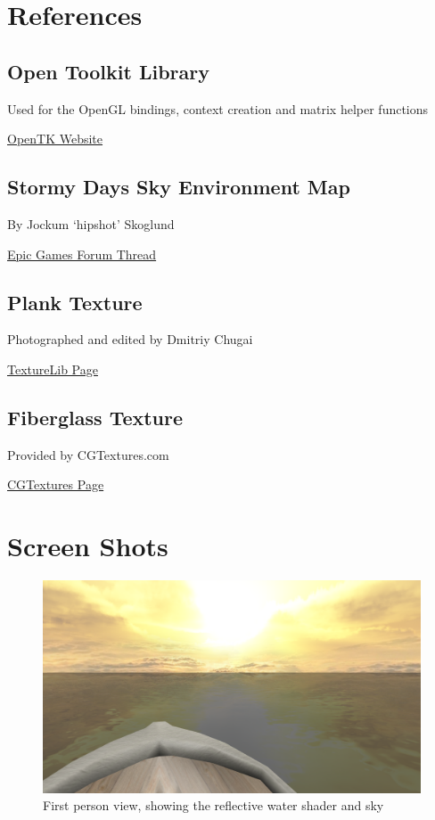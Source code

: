 \documentclass[a4paper,11pt]{article}
\begin{document}
\section{References}
\subsection{Open Toolkit Library}
Used for the OpenGL bindings, context creation and matrix helper functions

\href{http://www.opentk.com/}{OpenTK Website}

\subsection{Stormy Days Sky Environment Map}
By Jockum `hipshot' Skoglund

\href{http://forums.epicgames.com/threads/506748-My-skies-and-and-cliff-textures-(large-images}{Epic Games Forum Thread}

\subsection{Plank Texture}
Photographed and edited by Dmitriy Chugai

\href{http://texturelib.com/texture/?path=/Textures/wood/planks+new/wood_planks_new_0034}{TextureLib Page}

\subsection{Fiberglass Texture}
Provided by CGTextures.com

\href{http://www.cgtextures.com/texview.php?id=9707&PHPSESSID=7pk7t90or58pkeh3gnn73k1601}{CGTextures Page}

\newpage
\section{Screen Shots}
\begin{figure}[h!]
\centering
\includegraphics[width=\textwidth]{screen1.png}
\caption{First person view, showing the reflective water shader and sky}
\end{figure}
\end{document}
